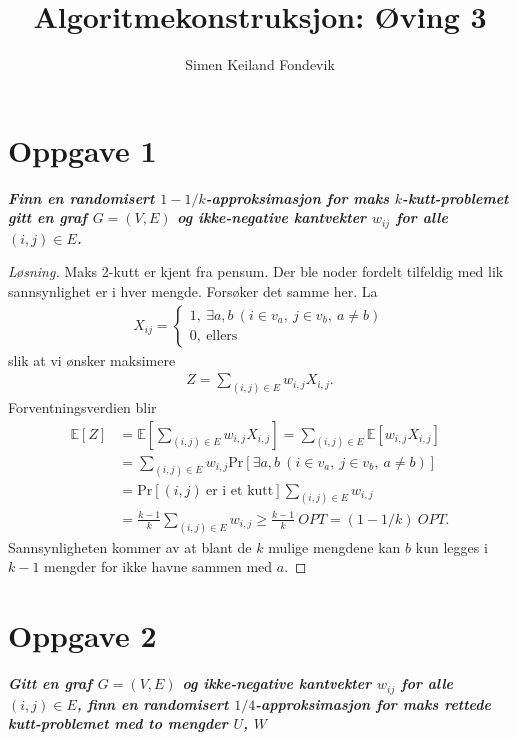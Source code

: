 \documentclass[12pt]{article}
\newenvironment{solution}{\begin{proof}[Løsning]}{\end{proof}}
\begin{document}
 
\title{Algoritmekonstruksjon: Øving 3}
\author{Simen Keiland Fondevik}

\maketitle

\section{Oppgave 1}
\it{\textbf{Finn en randomisert $1-1/k$-approksimasjon for maks $k$-kutt-problemet gitt en graf $G = (V, E)$ og ikke-negative kantvekter $w_{ij}$ for alle $(i, j) \in E$.}}

\begin{solution}
Maks 2-kutt er kjent fra pensum. Der ble noder fordelt tilfeldig med lik sannsynlighet er i hver mengde. Forsøker det samme her. La
\begin{align}
X_{ij} = \left\{
\begin{matrix}
1, ~\exists a,b ~(i \in v_a, ~ j \in v_b, ~a \neq b) \\ 0, ~ \textrm{ellers}
\end{matrix}
\right.
\end{align}
slik at vi ønsker maksimere
\begin{align}
Z = \sum_{(i, j) \in E} w_{i,j} X_{i, j}.
\end{align}
Forventningsverdien blir
\begin{align}
\mathbb{E}[Z] &= \mathbb{E} \left[ \sum_{(i, j) \in E} w_{i,j} X_{i, j} \right] = \sum_{(i, j) \in E} \mathbb{E} \left[ w_{i,j} X_{i, j} \right] \\
&= \sum_{(i, j) \in E} w_{i, j} \mathrm{Pr} \left[ \exists a,b ~(i \in v_a, ~ j \in v_b, ~a \neq b) \right] \\
&= \mathrm{Pr} \left[ (i, j)~\textrm{er i et kutt} \right] \sum_{(i, j) \in E} w_{i, j}\\
&= \frac{k-1}{k} \sum_{(i, j) \in E} w_{i, j} \geq \frac{k-1}{k} ~OPT = (1-1/k) ~OPT.
\end{align}
Sannsynligheten kommer av at blant de $k$ mulige mengdene kan $b$ kun legges i $k-1$ mengder for ikke havne sammen med $a$.
\end{solution}

\section{Oppgave 2}
\it{\textbf{Gitt en graf $G = (V, E)$ og ikke-negative kantvekter $w_{ij}$ for alle $(i, j) \in E$, finn en randomisert $1/4$-approksimasjon for maks rettede kutt-problemet med to mengder $U$, $W$}}
\end{document}
